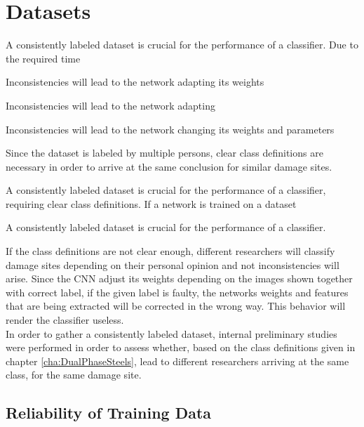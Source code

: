 \chapter{Datasets}

A consistently labeled dataset is crucial for the performance of a classifier. Due to the required time 


Inconsistencies will lead to the network adapting its weights


 Inconsistencies will lead to the network adapting 


Inconsistencies will lead to the network changing its weights and parameters 



Since the dataset is labeled by multiple persons, clear class definitions are necessary in order to arrive at the same conclusion for similar damage sites. 



A consistently labeled dataset is crucial for the performance of a classifier, requiring clear class definitions. If a network is trained on a dataset

A consistently labeled dataset is crucial for the performance of a classifier. 


 If the class definitions are not clear enough, different researchers will classify damage sites depending on their personal opinion and not inconsistencies will arise. Since the CNN adjust its weights depending on the images shown together with correct label, if the given label is faulty, the networks weights and features that are being extracted will be corrected in the wrong way. This behavior will render the classifier useless. \\

In order to gather a consistently labeled dataset, internal preliminary studies were performed in order to assess whether, based on the class definitions given in chapter \ref{cha:DualPhaseSteels}, lead to different researchers arriving at the same class, for the same damage site. \\




\section{Reliability of Training Data}

